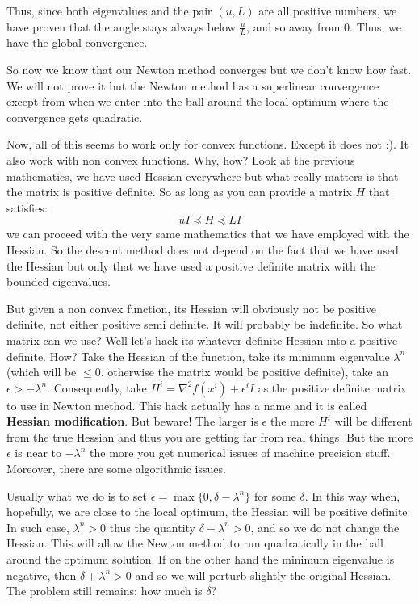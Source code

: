 Thus, since both eigenvalues and the pair $(u,L)$ are all positive numbers, we have proven that the angle stays always below $\frac{u}{L}$, and so away from 0. Thus, we have the global convergence.
\par So now we know that our Newton method converges but we don't know how fast. We will not prove it but the Newton method has a superlinear convergence except from when we enter into the ball around the local optimum where the convergence gets quadratic.
\par Now, all of this seems to work only for convex functions. Except it does not :). It also work with non convex functions. Why, how? Look at the previous mathematics, we have used Hessian everywhere but what really matters is that the matrix is positive definite. So as long as you can provide a matrix $H$ that satisfies:
\begin{equation}
    u I \preceq H  \preceq L I
\end{equation}
we can proceed with the very same mathematics that we have employed with the Hessian. So the descent method does not depend on the fact that we have used the Hessian but only that we have used a positive definite matrix with the bounded eigenvalues.
\par But given a non convex function, its Hessian will obviously not be positive definite, not either positive semi definite. It will probably be indefinite. So what matrix can we use? Well let's hack its whatever definite Hessian into a positive definite. How? Take the Hessian of the function, take its minimum eigenvalue $\lambda^n$ (which will be $\leq 0$. otherwise the matrix would be positive definite), take an $\epsilon > - \lambda^n$. Consequently, take $H^i = \nabla^2 f(x^i) + \epsilon^i I$ as the positive definite matrix to use in Newton method. This hack actually has a name and it is called \textbf{Hessian modification}. But beware! The larger is $\epsilon$ the more $H^i$ will be different from the true Hessian and thus you are getting far from real things. But the more $\epsilon$ is near to $- \lambda^n$ the more you get numerical issues of machine precision stuff. Moreover, there are some algorithmic issues.
\par Usually what we do is to set $\epsilon = \max\{0, \delta - \lambda^n\}$ for some $\delta$. In this way when, hopefully, we are close to the local optimum, the Hessian will be positive definite. In such case, $\lambda^n > 0$ thus the quantity $\delta - \lambda^n > 0$, and so we do not change the Hessian. This will allow the Newton method to run quadratically in the ball around the optimum solution. If on the other hand the minimum eigenvalue is negative, then $\delta + \lambda^n > 0$ and so we will perturb slightly the original Hessian. The problem still remains: how much is $\delta$?
